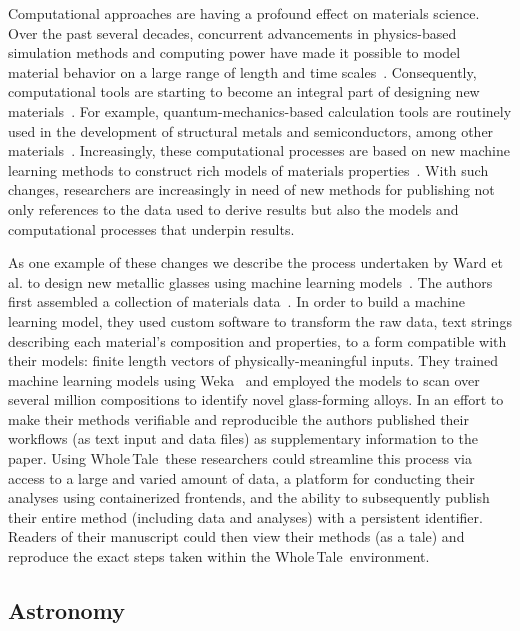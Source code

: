 \documentclass{elsarticle}
\newcommand{\wt}{Whole\,Tale}
\begin{document}
Computational approaches are having a profound effect on materials science. 
Over the past several decades, concurrent advancements in physics-based simulation methods and 
computing power have made it possible to model material behavior on a large range of length and
time scales~\cite{yip07handbook}. Consequently, computational tools are starting to become an integral part
of designing new materials~\cite{council04accelerating}. For example, quantum-mechanics-based calculation tools 
are routinely used in the development of structural metals and semiconductors, among other materials~\cite{curtarolo13high}. 
Increasingly, these computational processes are based on new machine
learning methods to construct rich models of materials properties~\cite{hill16materials, ward16materials, rajan05materials}. 
With such changes, researchers are increasingly in need of new methods
for publishing not only references to the data used to derive results
but also the models and computational processes that underpin results. 
 
As one example of these changes we describe the process undertaken by Ward
et al. to design new metallic glasses using machine learning models~\cite{ward16materials}. The authors first assembled a collection of materials data~\cite{kawazoe97phase}. In order to build 
a machine learning model, they used custom software to transform the raw data, text strings describing each material’s composition and properties, to a form compatible with their models: finite length vectors of physically-meaningful inputs. They trained machine learning models using Weka~\cite{hall09weka} and employed the models to scan over several million compositions to identify novel glass-forming alloys. 
In an effort to make their methods verifiable and reproducible the authors published their workflows (as text input and data files) as supplementary information to the paper. Using \wt\ these researchers could streamline this process via access to a large and varied amount of data, a platform for conducting their analyses
using containerized frontends, and the ability to subsequently publish their entire method (including data and analyses) with a persistent identifier. Readers of their
manuscript could then view their methods (as a tale) and reproduce the
exact steps taken within the \wt\ environment. 



\subsection{Astronomy}
\end{document}
